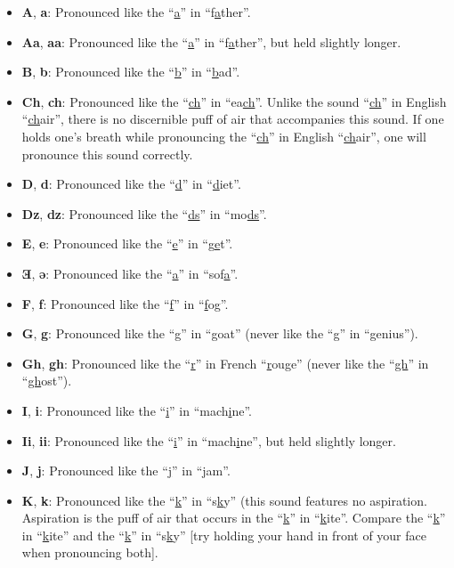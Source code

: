 \documentclass[oneside]{book}
\begin{document}
\begin{itemize}
\item
\textbf{A}, \textbf{a}:
Pronounced like the ``\uline{a}'' in ``f\uline{a}ther''.
\item
\textbf{Aa}, \textbf{aa}:
Pronounced like the ``\uline{a}'' in ``f\uline{a}ther'', but held slightly longer.
\item
\textbf{B}, \textbf{b}:
Pronounced like the ``\uline{b}'' in ``\uline{b}ad''.
\item
\textbf{Ch}, \textbf{ch}:
Pronounced like the ``\uline{ch}'' in ``ea\uline{ch}''.
Unlike the sound ``\uline{ch}'' in English ``\uline{ch}air'', there is no discernible puff of air that accompanies this sound.
If one holds one's breath while pronouncing the ``\uline{ch}'' in English ``\uline{ch}air'', one will pronounce this sound correctly.
\item
\textbf{D}, \textbf{d}:
Pronounced like the ``\uline{d}'' in ``\uline{d}iet''.
\item
\textbf{Dz}, \textbf{dz}:
Pronounced like the ``\uline{ds}'' in ``mo\uline{ds}''.
\item
\textbf{E}, \textbf{e}:
Pronounced like the ``\uline{e}'' in ``g\uline{e}t''.
\item
\textbf{Ǝ}, \textbf{ǝ}:
Pronounced like the ``\uline{a}'' in ``sof\uline{a}''.
\item
\textbf{F}, \textbf{f}:
Pronounced like the ``\uline{f}'' in ``\uline{f}og''.
\item
\textbf{G}, \textbf{g}:
Pronounced like the ``\uline{g}'' in ``\uline{g}oat'' (never like the ``\uline{g}'' in ``\uline{g}enius'').
\item
\textbf{Gh}, \textbf{gh}:
Pronounced like the ``\uline{r}'' in French ``\uline{r}ouge'' (never like the ``\uline{gh}'' in ``\uline{gh}ost'').
\item
\textbf{I}, \textbf{i}:
Pronounced like the ``\uline{i}'' in ``mach\uline{i}ne''.
\item
\textbf{Ii}, \textbf{ii}:
Pronounced like the ``\uline{i}'' in ``mach\uline{i}ne'', but held slightly longer.
\item
\textbf{J}, \textbf{j}:
Pronounced like the ``\uline{j}'' in ``\uline{j}am''.
\item
\textbf{K}, \textbf{k}:
Pronounced like the ``\uline{k}'' in ``s\uline{k}y'' (this sound features no aspiration.
Aspiration is the puff of air that occurs in the ``\uline{k}'' in ``\uline{k}ite''.
Compare the ``\uline{k}'' in ``\uline{k}ite'' and the ``\uline{k}'' in ``s\uline{k}y'' [try holding your hand in front of your face when pronouncing both].

\end{itemize}
\end{document}
